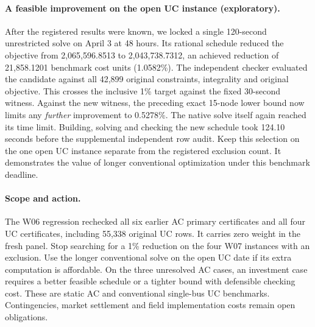 \documentclass[11pt,letterpaper]{article}
\begin{document}
\paragraph{A feasible improvement on the open UC instance (exploratory).}
After the registered results were known, we locked a single 120-second unrestricted solve on April 3 at 48 hours. Its rational schedule reduced the objective from 2,065,596.8513 to 2,043,738.7312, an achieved reduction of 21,858.1201 benchmark cost units (1.0582\%). The independent checker evaluated the candidate against all 42,899 original constraints, integrality and original objective. This crosses the inclusive 1\% target against the fixed 30-second witness. Against the new witness, the preceding exact 15-node lower bound now limits any \emph{further} improvement to 0.5278\%. The native solve itself again reached its time limit. Building, solving and checking the new schedule took 124.10 seconds before the supplemental independent row audit. Keep this selection on the one open UC instance separate from the registered exclusion count. It demonstrates the value of longer conventional optimization under this benchmark deadline.

\paragraph{Scope and action.} The W06 regression rechecked all six earlier AC primary certificates and all four UC certificates, including 55,338 original UC rows. It carries zero weight in the fresh panel. Stop searching for a 1\% reduction on the four W07 instances with an exclusion. Use the longer conventional solve on the open UC date if its extra computation is affordable. On the three unresolved AC cases, an investment case requires a better feasible schedule or a tighter bound with defensible checking cost. These are static AC and conventional single-bus UC benchmarks. Contingencies, market settlement and field implementation costs remain open obligations.
\end{document}
